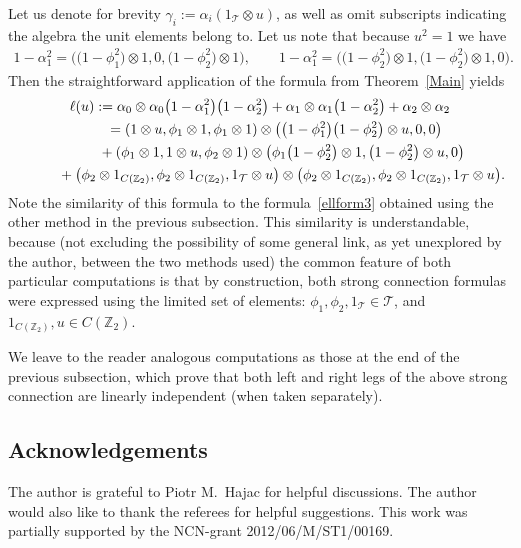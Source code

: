 \documentclass[pdftex]{sigma}
\begin{document}
Let us denote for brevity $\gamma_i:=\alpha_i(1_{\mathcal{T}}\otimes u)$, as well as omit subscripts indicating the
algebra the unit elements belong to.
Let us note that because $u^2=1$ we have
\begin{gather*}
1-\alpha_1^2=\big(\big(1-\phi_1^2\big)\otimes1,0,\big(1-\phi^2_2\big)\otimes 1\big),
\qquad
1-\alpha_1^2=\big(\big(1-\phi_2^2\big)\otimes1,\big(1-\phi^2_2\big)\otimes1,0\big).
\end{gather*}
Then the straightforward application of the formula from Theorem~\ref{Main} yields
\begin{gather*}
\ell(u) :=\alpha_0\otimes\alpha_0\big(1-\alpha_1^2\big)\big(1-\alpha_2^2\big) +\alpha_1\otimes\alpha_1\big(1-\alpha_2^2\big) +\alpha_2\otimes\alpha_2
\\
\phantom{\ell(u)\;}
 =(1\otimes u,\phi_1\otimes1,\phi_1\otimes 1) \otimes\big(\big(1-\phi_1^2\big)\big(1-\phi_2^2\big)\otimes u,0,0\big)
\\
\hphantom{\ell(u):=}{}
+(\phi_1\otimes1,1\otimes u,\phi_2\otimes 1) \otimes\big(\phi_1\big(1-\phi_2^2\big)\otimes1,\big(1-\phi_2^2\big)\otimes u,0\big)
\\
\hphantom{\ell(u):=}{}
+\big(\phi_2\otimes 1_{C({\mathbb Z_2})},\phi_2\otimes 1_{C({\mathbb Z_2})},1_{{\mathcal{T}}}\otimes u\big)
\otimes\big(\phi_2\otimes 1_{C({\mathbb Z_2})},\phi_2\otimes 1_{C({\mathbb Z_2})},1_{{\mathcal{T}}}\otimes u\big).
\end{gather*}
Note the similarity of this formula to the formula~\eqref{ellform3} obtained using the other method in the previous
subsection.
This similarity is understandable, because (not excluding the possibility of some general link, as yet unexplored by the
author, between the two methods used) the common feature of both particular computations is that by construction, both
strong connection formulas were expressed using the limited set of elements:
$\phi_1,\phi_2,1_{\mathcal{T}}\in{\mathcal{T}}$, and $1_{C({\mathbb Z_2})}, u\in C({\mathbb Z_2})$.

We leave to the reader analogous computations as those at the end of the previous subsection, which prove that both left
and right legs of the above strong connection are linearly independent (when taken separately).

\subsection*{Acknowledgements}

The author is grateful to Piotr M.~Hajac for helpful discussions.
The author would also like to thank the referees for helpful suggestions.
This work was partially supported by the NCN-grant 2012/06/M/ST1/00169.
\end{document}
